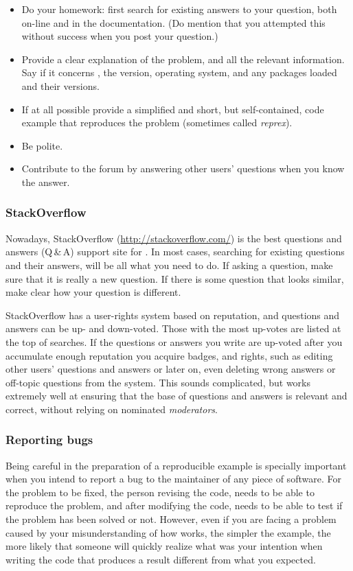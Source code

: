 \documentclass[krantz2]{krantz}\usepackage{knitr}%
\begin{document}
\begin{itemize}
  \item Do your homework: first search for existing answers to your question, both on-line and in the documentation. (Do mention that you attempted this without success when you post your question.)
  \item Provide a clear explanation of the problem, and all the relevant information. Say if it concerns \Rpgrm, the version, operating system, and any packages loaded and their versions.
  \item If at all possible provide a simplified and short, but self-contained, code example that reproduces the problem (sometimes called \emph{reprex}).
  \item Be polite.
  \item Contribute to the forum by answering other users' questions when you know the answer.
\end{itemize}

\subsubsection{StackOverflow}

Nowadays, StackOverflow (\url{http://stackoverflow.com/}) is the best questions and answers (Q\,\&\,A) support site for \Rpgrm. In most cases, searching for existing questions and their answers, will be all what you need to do. If asking a question, make sure that it is really a new question. If there is some question that looks similar, make clear how your question is different.

StackOverflow has a user-rights system based on reputation, and questions and answers can be up- and down-voted. Those with the most up-votes are listed at the top of searches. If the questions or answers you write are up-voted after you accumulate enough reputation you acquire badges, and rights, such as editing other users' questions and answers or later on, even deleting wrong answers or off-topic questions from the system. This sounds complicated, but works extremely well at ensuring that the base of questions and answers is relevant and correct, without relying on nominated \emph{moderators}.

\subsubsection{Reporting bugs}

Being careful in the preparation of a reproducible example is specially important when you intend to report a bug to the maintainer of any piece of software. For the problem to be fixed, the person revising the code, needs to be able to reproduce the problem, and after modifying the code, needs to be able to test if the problem has been solved or not. However, even if you are facing a problem caused by your misunderstanding of how \Rlang works, the simpler the example, the more likely that someone will quickly realize what was your intention when writing the code that produces a result different from what you expected.
\end{document}
